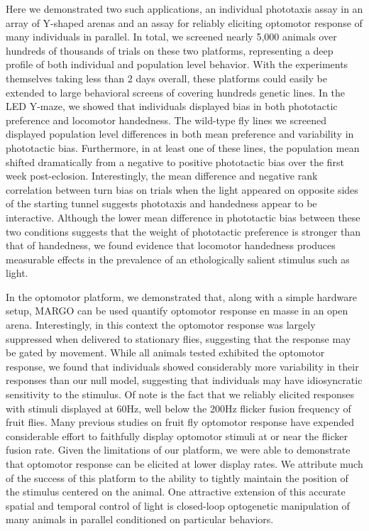 \documentclass[10pt]{article}
\begin{document}
\begin{multicols}{2}
Here we demonstrated two such applications, an individual phototaxis assay in an array of Y-shaped arenas and an assay for reliably eliciting optomotor response of many individuals in parallel. In total, we screened nearly 5,000 animals over hundreds of thousands of trials on these two platforms, representing a deep profile of both individual and population level behavior. With the experiments themselves taking less than 2 days overall, these platforms could easily be extended to large behavioral screens of covering hundreds genetic lines. In the LED Y-maze, we showed that individuals displayed bias in both phototactic preference and locomotor handedness. The wild-type fly lines we screened displayed population level differences in both mean preference and variability in phototactic bias. Furthermore, in at least one of these lines, the population mean shifted dramatically from a negative to positive phototactic bias over the first week post-eclosion. Interestingly, the mean difference and negative rank correlation between turn bias on trials when the light appeared on opposite sides of the starting tunnel suggests phototaxis and handedness appear to be interactive. Although the lower mean difference in phototactic bias between these two conditions suggests that the weight of phototactic preference is stronger than that of handedness, we found evidence that locomotor handedness produces measurable effects in the prevalence of an ethologically salient stimulus such as light. 

In the optomotor platform, we demonstrated that, along with a simple hardware setup, MARGO can be used quantify optomotor response en masse in an open arena. Interestingly, in this context the optomotor response was largely suppressed when delivered to stationary flies, suggesting that the response may be gated by movement. While all animals tested exhibited the optomotor response, we found that individuals showed considerably more variability in their responses than our null model, suggesting that individuals may have idiosyncratic sensitivity to the stimulus. Of note is the fact that we reliably elicited responses with stimuli displayed at 60Hz, well below the 200Hz flicker fusion frequency of fruit flies. Many previous studies on fruit fly optomotor response have expended considerable effort to faithfully display optomotor stimuli at or near the flicker fusion rate. Given the limitations of our platform, we were able to demonstrate that optomotor response can be elicited at lower display rates. We attribute much of the success of this platform to the ability to tightly maintain the position of the stimulus centered on the animal. One attractive extension of this accurate spatial and temporal control of light is closed-loop optogenetic manipulation of many animals in parallel conditioned on particular behaviors.


\end{multicols}
\end{document}
